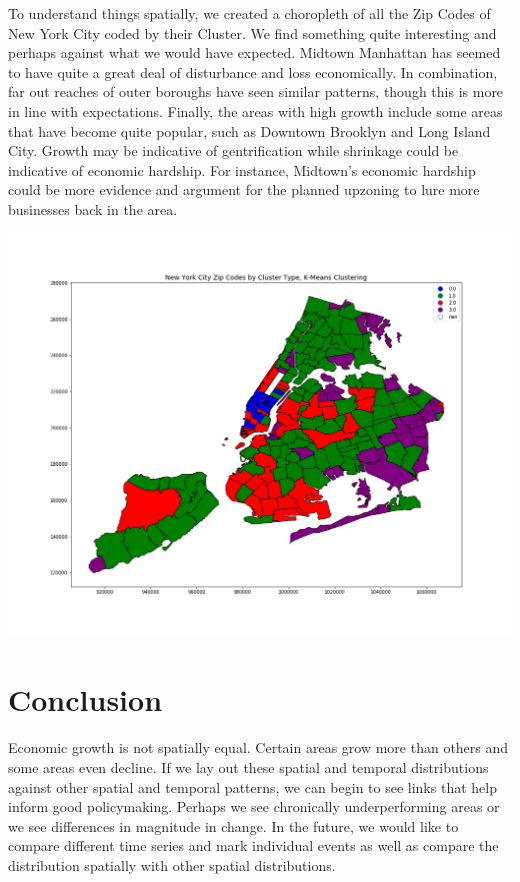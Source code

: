 \documentclass[letter, 11pt]{article} %
\begin{document}
		To understand things spatially, we created a choropleth of all the Zip Codes of New York City coded by their Cluster. We find something quite interesting and perhaps against what we would have expected. Midtown Manhattan has seemed to have quite a great deal of disturbance and loss economically. In combination, far out reaches of outer boroughs have seen similar patterns, though this is more in line with expectations. Finally, the areas with high growth include some areas that have become quite popular, such as Downtown Brooklyn and Long Island City. Growth may be indicative of gentrification while shrinkage could be indicative of economic hardship. For instance, Midtown's economic hardship could be more evidence and argument for the planned upzoning to lure more businesses back in the area.
		
		\includegraphics[width=\textwidth]{map.png}

	\pagebreak


\section{Conclusion}
Economic growth is not spatially equal. Certain areas grow more than others and some areas even decline. If we lay out these spatial and temporal distributions against other spatial and temporal patterns, we can begin to see links that help inform good policymaking. Perhaps we see chronically underperforming areas or we see differences in magnitude in change. In the future, we would like to compare different time series and mark individual events as well as compare the distribution spatially with other spatial distributions.



\end{document}
